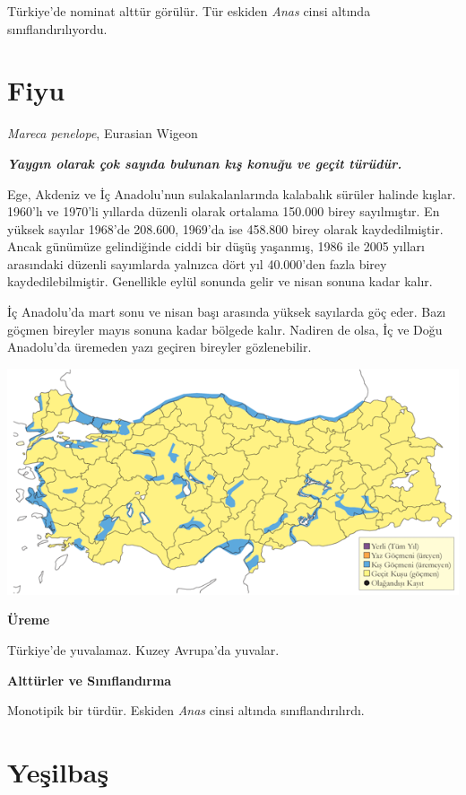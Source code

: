 \documentclass[
  a4paper,
  DIV=11,
  numbers=noendperiod]{scrreprt}
\begin{document}
Türkiye'de nominat alttür görülür. Tür eskiden \emph{Anas} cinsi altında
sınıflandırılıyordu.

\section{Fiyu}\label{fiyu}

\emph{Mareca penelope}, Eurasian Wigeon

\textbf{\emph{Yaygın olarak çok sayıda bulunan kış konuğu ve geçit
türüdür.}}

Ege, Akdeniz ve İç Anadolu'nun sulakalanlarında kalabalık sürüler
halinde kışlar. 1960'lı ve 1970'li yıllarda düzenli olarak ortalama
150.000 birey sayılmıştır. En yüksek sayılar 1968'de 208.600, 1969'da
ise 458.800 birey olarak kaydedilmiştir. Ancak günümüze gelindiğinde
ciddi bir düşüş yaşanmış, 1986 ile 2005 yılları arasındaki düzenli
sayımlarda yalnızca dört yıl 40.000'den fazla birey kaydedilebilmiştir.
Genellikle eylül sonunda gelir ve nisan sonuna kadar kalır.

İç Anadolu'da mart sonu ve nisan başı arasında yüksek sayılarda göç
eder. Bazı göçmen bireyler mayıs sonuna kadar bölgede kalır. Nadiren de
olsa, İç ve Doğu Anadolu'da üremeden yazı geçiren bireyler gözlenebilir.

\includegraphics{images/harita_Page_015.png}

\textbf{Üreme}

Türkiye'de yuvalamaz. Kuzey Avrupa'da yuvalar.

\textbf{Alttürler ve Sınıflandırma}

Monotipik bir türdür. Eskiden \emph{Anas} cinsi altında
sınıflandırılırdı.

\section{Yeşilbaş}\label{yeux15filbaux15f}
\end{document}
